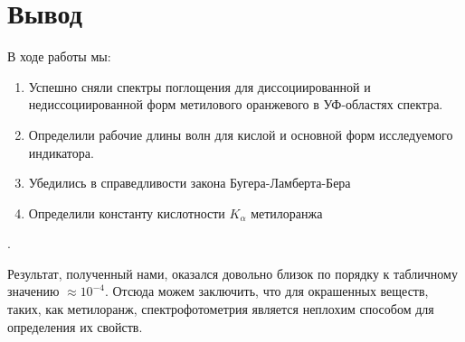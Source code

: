 \documentclass[a4paper,12pt]{article}
\begin{document}
\section*{Вывод}
В ходе работы мы:
\begin{enumerate}
    \item Успешно сняли спектры поглощения для диссоциированной и недиссоциированной форм метилового оранжевого в УФ-областях спектра.
    \item Определили рабочие длины волн для кислой и основной форм исследуемого индикатора. 
    \item Убедились в справедливости закона Бугера-Ламберта-Бера
    \item Определили константу кислотности $K_\alpha$ метилоранжа
\end{enumerate}. 

Результат, полученный нами, оказался довольно близок по порядку к табличному значению $\approx10^{-4}$. Отсюда можем заключить, что для окрашенных веществ, таких, как метилоранж, спектрофотометрия является неплохим способом для определения их свойств.
\end{document}
